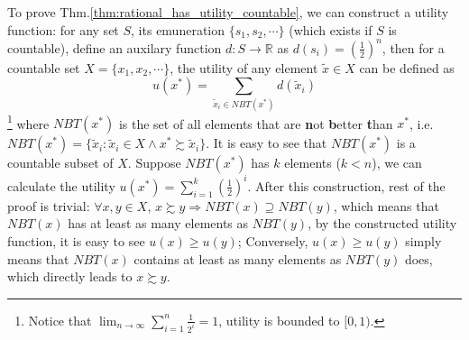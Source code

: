 To prove Thm.\ref{thm:rational_has_utility_countable}, we can construct a utility function: for any set $S$, its emuneration $\{s_1,s_2,\cdots\}$ (which exists if $S$ is countable), define an auxilary function $d:S\rightarrow \mathbb{R}$ as $d(s_i)=\left(\frac{1}{2}\right)^n$, then for a countable set $X=\{x_1,x_2,\cdots\}$, the utility of any element $\tilde{x}\in X$ can be defined as 
$$u(x^*)=\sum_{\tilde{x}_i\in NBT(x^*)}d(\tilde{x}_i)$$\footnote{Notice that $\lim_{n\rightarrow\infty}\sum_{i=1}^n\frac{1}{2^i}=1$, utility is bounded to $[0,1)$.}
where $NBT(x^*)$ is the set of all elements that are \textbf{n}ot \textbf{b}etter \textbf{t}han $x^*$, i.e. $NBT(x^*)=\{\tilde{x}_i:\tilde{x}_i\in X \land x^*\succsim \tilde{x}_i\}$. It is easy to see that $NBT(x^*)$ is a countable subset of $X$. Suppose $NBT(x^*)$ has $k$ elements ($k<n$), we can calculate the utility $u(x^*)=\sum_{i=1}^k\left(\frac{1}{2}\right)^i$. After this construction,
rest of the proof is trivial: $\forall x,y\in X$, $x\succsim y\Rightarrow NBT(x)\supseteq NBT(y)$, which means that $NBT(x)$ has at least as many elements as $NBT(y)$, by the constructed utility function, it is easy to see $u(x)\geq u(y)$; Conversely, $u(x)\geq u(y)$ simply means that $NBT(x)$ contains at least as many elements as $NBT(y)$ does, which directly leads to $x\succsim y$.

